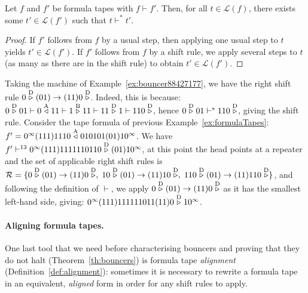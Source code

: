 \begin{lemma}\label{lem:vdashFormulaTapes} Let $f$ and $f'$ be formula tapes with $f \vdash f'$. Then, for all $t \in \mathcal{L}(f)$, there exists some $t' \in \mathcal{L}(f')$ such that $t \vdash^* t'$.
\end{lemma}
\begin{proof}
    If $f'$ follows from $f$ by a usual step, then applying one usual step to $t$ yields $t'\in\mathcal{L}(f')$. If $f'$ follows from $f$ by a shift rule, we apply several steps to $t$ (as many as there are in the shift rule) to obtain $t' \in \mathcal{L}(f')$.
\end{proof}


\begin{example}\label{ex:shiftRules}
    Taking the machine of Example~\ref{ex:bouncer88427177}, we have the right shift rule $0 \stackrel{\text{D}}\triangleright(01) \to (11)0\stackrel{\text{D}}\triangleright$. Indeed, this is because: $0 \stackrel{\text{D}}\triangleright01 \vdash 0\stackrel{\text{A}}\triangleleft11 \vdash 1\stackrel{\text{B}}\triangleright11 \vdash 11\stackrel{\text{D}}\triangleright1 \vdash 110\stackrel{\text{D}}\triangleright$, hence $0 \stackrel{\text{D}}\triangleright01 \vdash^* 110\stackrel{\text{D}}\triangleright$, giving the shift rule. Consider the tape formula of previous Example~\ref{ex:formulaTapes}: $f' = 0^\infty(111)1110 \stackrel{\text{A}}\triangleleft 010101(01)10^\infty$. We have $f' \vdash^{13} 0^\infty (111)1111110110 \stackrel{\text{D}}\triangleright (01) 10^\infty$, at this point the head points at a repeater and the set of applicable right shift rules is $\mathcal{R} = \{ 0 \stackrel{\text{D}}\triangleright(01) \to (11)0\stackrel{\text{D}}\triangleright,\; 10 \stackrel{\text{D}}\triangleright(01) \to (11)10\stackrel{\text{D}}\triangleright,\; 110 \stackrel{\text{D}}\triangleright(01) \to (11)110\stackrel{\text{D}}\triangleright\}$, and following the definition of $\vdash$, we apply $0 \stackrel{\text{D}}\triangleright(01) \to (11)0\stackrel{\text{D}}\triangleright$ as it has the smallest left-hand side, giving: $0^\infty (111)111111011(11)0 \stackrel{\text{D}}\triangleright 10^\infty$.

\end{example}

\paragraph*{Aligning formula tapes.} One last tool that we need before characterising bouncers and proving that they do not halt (Theorem~\ref{th:bouncers}) is formula tape \textit{alignment} (Definition~\ref{def:alignment}): sometimes it is necessary to rewrite a formula tape in an equivalent, \textit{aligned} form in order for any shift rules to apply.

